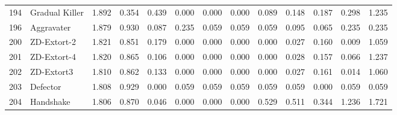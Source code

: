 \begin{tabular}{rlrrrrrrrrrrr}
  194 &         Gradual Killer &           1.892 &       0.354 &    0.439 &             0.000 &         0.000 &           0.000 &            0.089 &          0.148 &         0.187 &            0.298 &         1.235 \\
  196 &             Aggravater &           1.879 &       0.930 &    0.087 &             0.235 &         0.059 &           0.059 &            0.059 &          0.095 &         0.065 &            0.235 &         0.235 \\
  200 &            ZD-Extort-2 &           1.821 &       0.851 &    0.179 &             0.000 &         0.000 &           0.000 &            0.000 &          0.027 &         0.160 &            0.009 &         1.059 \\
  201 &            ZD-Extort-4 &           1.820 &       0.865 &    0.106 &             0.000 &         0.000 &           0.000 &            0.000 &          0.028 &         0.157 &            0.066 &         1.237 \\
  202 &             ZD-Extort3 &           1.810 &       0.862 &    0.133 &             0.000 &         0.000 &           0.000 &            0.000 &          0.027 &         0.161 &            0.014 &         1.060 \\
  203 &               Defector &           1.808 &       0.929 &    0.000 &             0.059 &         0.059 &           0.059 &            0.059 &          0.059 &         0.000 &            0.059 &         0.059 \\
  204 &              Handshake &           1.806 &       0.870 &    0.046 &             0.000 &         0.000 &           0.000 &            0.529 &          0.511 &         0.344 &            1.236 &         1.721 \\
\bottomrule
\end{tabular}
